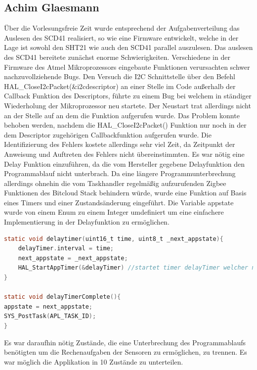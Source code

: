 \documentclass[]{article}
\begin{document}
\subsection{Achim Glaesmann}
Über die Vorlesungsfreie Zeit wurde entsprechend der Aufgabenverteilung das Auslesen des SCD41 realisiert, so wie eine Firmware entwickelt, welche in der Lage ist sowohl den SHT21 wie auch den SCD41 parallel auszulesen. Das auslesen des SCD41 bereitete zunächst enorme Schwierigkeiten. Verschiedene in der Firmware des Atmel Mikroprozessors eingebaute Funktionen verursachten schwer nachzuvollziehende Bugs. Den Versuch die I2C Schnittstelle über den Befehl HAL_CloseI2cPacket(&i2cdescriptor) an einer Stelle im Code außerhalb der Callback Funktion des Descriptors, führte zu einem Bug bei welchem in ständiger Wiederholung der Mikroprozessor neu startete. Der Neustart trat allerdings nicht an der Stelle auf an dem die Funktion aufgerufen wurde. Das Problem konnte behoben werden, nachdem die HAL_CloseI2cPacket() Funktion nur noch in der dem Descriptor zugehörigen Callbackfunktion aufgerufen wurde. Die Identifizierung des Fehlers kostete allerdings sehr viel Zeit, da Zeitpunkt der Anweisung und Auftreten des Fehlers nicht übereinstimmten.
Es war nötig eine Delay Funktion einzuführen, da die vom Hersteller gegebene Delayfunktion den Programmablauf nicht unterbrach. Da eine längere Programmunterbrechung allerdings ohnehin die vom Taskhandler regelmäßig aufzurufenden Zigbee Funktionen des Bitcloud Stack behindern würde, wurde eine Funktion auf Basis eines Timers und einer Zustandsänderung eingeführt. Die Variable appstate wurde von einem Enum zu einem Integer umdefiniert um eine einfachere Implementierung in der Delayfunktion zu ermöglichen. 

\begin{lstlisting}[language=C,frame=single, caption = Delay Timer, label = delay_timer] 
static void delaytimer(uint16_t time, uint8_t _next_appstate){
	delayTimer.interval = time;
	next_appstate = _next_appstate;
	HAL_StartAppTimer(&delayTimer) //startet timer delayTimer welcher nach der angegebenen Zeit in ms die Funktion delayTimerComplete(); aufruft
}

static void delayTimerComplete(){
appstate = next_appstate;
SYS_PostTask(APL_TASK_ID); 
}

\end{lstlisting} 

Es war daraufhin nötig Zustände, die eine Unterbrechung des Programmablaufs benötigten um die Rechenaufgaben der Sensoren zu ermöglichen, zu trennen. Es war möglich die Applikation in 10 Zustände zu unterteilen.
\end{document}
